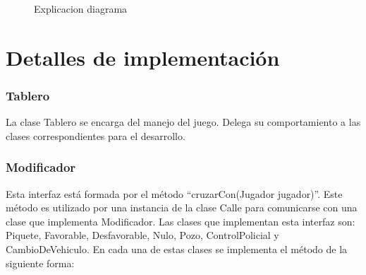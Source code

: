 \documentclass[titlepage,a4paper]{article}
\begin{document}
\begin{figure}[H]
\centering
\caption{\label{fig:class01}Explicacion diagrama}
\end{figure}

\section{Detalles de implementación}\label{sec:implementacion}

\subsubsection[Tablero]{Tablero}

La clase Tablero se encarga del manejo del juego. Delega su comportamiento a las clases correspondientes para el desarrollo.

\subsubsection[Modificador]{Modificador}

Esta interfaz está formada por el método “cruzarCon(Jugador jugador)”. Este método es utilizado por una instancia de la clase Calle para comunicarse con una clase que implementa Modificador. 
Las clases que implementan esta interfaz son: Piquete, Favorable, Desfavorable, Nulo, Pozo, ControlPolicial y CambioDeVehiculo. En cada una de estas clases se implementa el método de la siguiente forma:
\end{document}
